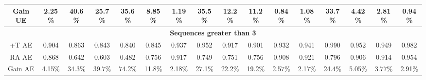 \begin{table*}[hbt]
\begin{tabular}{c|ccccc|ccccc|ccccc}
Gain UE &2.25\%&\hspace{-0.2cm}40.6\%&\hspace{-0.2cm}25.7\%&\hspace{-0.2cm}35.6\% &\hspace{-0.2cm} 8.85\% &\hspace{-0.2cm} 1.19\% &\hspace{-0.2cm} 35.5\% &\hspace{-0.2cm} 12.2\% &\hspace{-0.2cm} 11.2\% &\hspace{-0.2cm} 0.84\% &\hspace{-0.2cm} 1.08\% &\hspace{-0.2cm} 33.7\% &\hspace{-0.2cm} 4.42\% &\hspace{-0.2cm} 2.81\% &\hspace{-0.2cm} 0.94\% \\\hline
\multicolumn{16}{c}{\textbf{Sequences greater than 3}} \\\hline
+T AE & 0.904 & 0.863 & 0.843 & 0.840 & 0.845 & 0.937 & 0.952 & 0.917 & 0.901 & 0.932 & 0.941 & 0.990 & 0.952 & 0.949 & 0.982 \\\hline
RA AE & 0.868 & 0.642 & 0.603 & 0.482 & 0.756 & 0.917 & 0.749 & 0.751 & 0.756 & 0.908 & 0.921 & 0.796 & 0.906 & 0.914 & 0.954 \\\hline
Gain AE &4.15\%&\hspace{-0.2cm}34.3\%&\hspace{-0.2cm}39.7\%&\hspace{-0.2cm}74.2\% &\hspace{-0.2cm} 11.8\% &\hspace{-0.2cm} 2.18\% &\hspace{-0.2cm} 27.1\% &\hspace{-0.2cm} 22.2\% &\hspace{-0.2cm} 19.2\% &\hspace{-0.2cm} 2.57\% &\hspace{-0.2cm} 2.17\% &\hspace{-0.2cm} 24.4\% &\hspace{-0.2cm} 5.05\% &\hspace{-0.2cm} 3.77\% &\hspace{-0.2cm} 2.91\% \\\hline

\end{tabular}
\end{table*}
